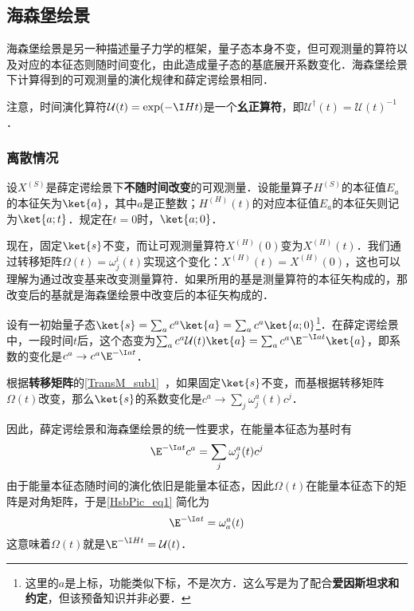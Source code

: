\subsection{海森堡绘景}

海森堡绘景是另一种描述量子力学的框架，量子态本身不变，但可观测量的算符以及对应的本征态则随时间变化，由此造成量子态的基底展开系数变化．海森堡绘景下计算得到的可观测量的演化规律和薛定谔绘景相同．

注意，时间演化算符$\mathcal{U}(t)=\exp(-\I Ht)$是一个\textbf{幺正算符}，即$\mathcal{U}^\dagger(t)=\mathcal{U}(t)^{-1}$．

\subsubsection{离散情况}



设$X^{(S)}$是薛定谔绘景下\textbf{不随时间改变}的可观测量．设能量算子$H^{(S)}$的本征值$E_a$的本征矢为$\ket{a}$，其中$a$是正整数；$H^{(H)}(t)$的对应本征值$E_a$的本征矢则记为$\ket{a; t}$．规定在$t=0$时，$\ket{a; 0}$．

现在，固定$\ket{s}$不变，而让可观测量算符$X^{(H)}(0)$变为$X^{(H)}(t)$．我们通过转移矩阵$\Omega(t)=\omega^i_j(t)$实现这个变化：$X^{(H)}(t)=X^{(H)}(0)$，这也可以理解为通过改变基来改变测量算符．如果所用的基是测量算符的本征矢构成的，那改变后的基就是海森堡绘景中改变后的本征矢构成的．

设有一初始量子态$\ket{s}=\sum_a c^a\ket{a}=\sum_a c^a\ket{a; 0}$\footnote{这里的$a$是上标，功能类似下标，不是次方．这么写是为了配合\textbf{爱因斯坦求和约定}，但该预备知识并非必要．}．在薛定谔绘景中，一段时间$t$后，这个态变为$\sum_a c^a\mathcal{U}(t)\ket{a}=\sum_ac^a\E^{-\I at}\ket{a}$，即系数的变化是$c^a\to c^a\E^{-\I at}$．

根据\textbf{转移矩阵}的\autoref{TransM_sub1}~，如果固定$\ket{s}$不变，而基根据转移矩阵$\Omega(t)$改变，那么$\ket{s}$的系数变化是$c^a \to \sum_{j}\omega^a_j(t)c^j$．

因此，薛定谔绘景和海森堡绘景的统一性要求，在能量本征态为基时有
\begin{equation}\label{HsbPic_eq1}
\E^{-\I at}c^a = \sum_{j}\omega^a_j(t)c^j
\end{equation}
由于能量本征态随时间的演化依旧是能量本征态，因此$\Omega(t)$在能量本征态下的矩阵是对角矩阵，于是\autoref{HsbPic_eq1} 简化为
\begin{equation}
\E^{-\I at} = \omega^a_a(t)
\end{equation}
这意味着$\Omega(t)$就是$\E^{-\I H t}=\mathcal{U}(t)$．

